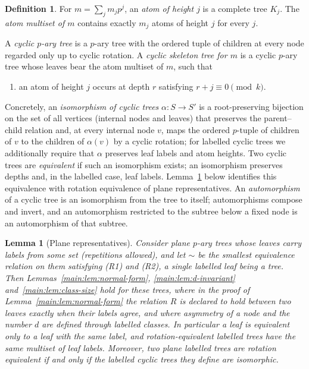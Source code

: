 \documentclass[11pt]{article}
\newtheorem{lemma}[theorem]{Lemma}
\theoremstyle{definition}
\newtheorem{definition}[theorem]{Definition}
\theoremstyle{remark}
\numberwithin{equation}{section}
\numberwithin{figure}{section}
\begin{document}
\begin{definition}\label{main:def:skeleton}
For $m=\sum_jm_jp^j$, an \emph{atom of height $j$} is a complete tree $K_j$.  The \emph{atom multiset of $m$} contains exactly $m_j$ atoms of height $j$ for every $j$.

A \emph{cyclic $p$-ary tree} is a $p$-ary tree with the ordered tuple of children at every node regarded only up to cyclic rotation.  A \emph{cyclic skeleton tree for $m$} is a cyclic $p$-ary tree whose leaves bear the atom multiset of $m$, such that
\begin{enumerate}
\item[\textup{(S)}] an atom of height $j$ occurs at depth $r$ satisfying $r+j\equiv0\pmod k$.
\end{enumerate}
Concretely, an \emph{isomorphism of cyclic trees} $\alpha:S\to S'$ is a root-preserving bijection on the set of all vertices (internal nodes and leaves) that preserves the parent--child relation and, at every internal node $v$, maps the ordered $p$-tuple of children of $v$ to the children of $\alpha(v)$ by a cyclic rotation; for labelled cyclic trees we additionally require that $\alpha$ preserves leaf labels and atom heights.  Two cyclic trees are \emph{equivalent} if such an isomorphism exists; an isomorphism preserves depths and, in the labelled case, leaf labels.  Lemma~\ref{main:lem:plane-cyclic} below identifies this equivalence with rotation equivalence of plane representatives.  An \emph{automorphism} of a cyclic tree is an isomorphism from the tree to itself; automorphisms compose and invert, and an automorphism restricted to the subtree below a fixed node is an automorphism of that subtree.
\end{definition}
\begin{lemma}[Plane representatives]\label{main:lem:plane-cyclic}
Consider plane $p$-ary trees whose leaves carry labels from some set (repetitions allowed), and let $\sim$ be the smallest equivalence relation on them satisfying (R1) and (R2), a single labelled leaf being a tree.  Then Lemmas~\ref{main:lem:normal-form}, \ref{main:lem:d-invariant} and~\ref{main:lem:class-size} hold for these trees, where in the proof of Lemma~\ref{main:lem:normal-form} the relation $R$ is declared to hold between two leaves exactly when their labels agree, and where asymmetry of a node and the number $d$ are defined through labelled classes.  In particular a leaf is equivalent only to a leaf with the same label, and rotation-equivalent labelled trees have the same multiset of leaf labels.  Moreover, two plane labelled trees are rotation equivalent if and only if the labelled cyclic trees they define are isomorphic.
\end{lemma}
\end{document}
